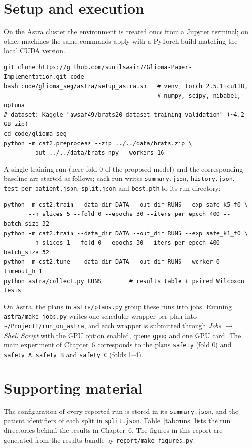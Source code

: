 \section{Setup and execution}
On the Astra cluster the environment is created once from a Jupyter terminal; on other machines the same commands apply with a PyTorch build matching the local CUDA version.
{\footnotesize\begin{verbatim}
git clone https://github.com/sunilswain7/Glioma-Paper-Implementation.git code
bash code/glioma_seg/astra/setup_astra.sh   # venv, torch 2.5.1+cu118,
                                            # numpy, scipy, nibabel, optuna
# dataset: Kaggle "awsaf49/brats20-dataset-training-validation" (~4.2 GB zip)
cd code/glioma_seg
python -m cst2.preprocess --zip ../../data/brats.zip \
       --out ../../data/brats_npy --workers 16
\end{verbatim}}
A single training run (here fold 0 of the proposed model) and the corresponding baseline are started as follows; each run writes \texttt{summary.json}, \texttt{history.json}, \texttt{test\_per\_patient.json}, \texttt{split.json} and \texttt{best.pth} to its run directory:
{\footnotesize\begin{verbatim}
python -m cst2.train --data_dir DATA --out_dir RUNS --exp safe_k5_f0 \
       --n_slices 5 --fold 0 --epochs 30 --iters_per_epoch 400 --batch_size 32
python -m cst2.train --data_dir DATA --out_dir RUNS --exp safe_k1_f0 \
       --n_slices 1 --fold 0 --epochs 30 --iters_per_epoch 400 --batch_size 32
python -m cst2.tune  --data_dir DATA --out_dir RUNS --worker 0 --timeout_h 1
python astra/collect.py RUNS        # results table + paired Wilcoxon tests
\end{verbatim}}
On Astra, the plans in \texttt{astra/plans.py} group these runs into jobs. Running \texttt{astra/make\_jobs.py} writes one scheduler wrapper per plan into \texttt{\textasciitilde/Project1/run\_on\_astra}, and each wrapper is submitted through \emph{Jobs $\rightarrow$ Shell Script} with the GPU option enabled, queue \texttt{gpuq} and one GPU card. The main experiment of Chapter~6 corresponds to the plans \texttt{safety} (fold 0) and \texttt{safety\_A}, \texttt{safety\_B} and \texttt{safety\_C} (folds 1--4).

\section{Supporting material}
The configuration of every reported run is stored in its \texttt{summary.json}, and the patient identifiers of each split in \texttt{split.json}. Table~\ref{tab:runs} lists the run directories behind the results in Chapter~6. The figures in this report are generated from the results bundle by \texttt{report/make\_figures.py}.


